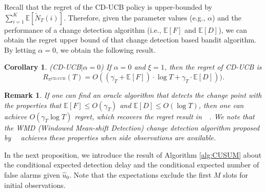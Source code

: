 \documentclass[letterpaper]{article} %
\newtheorem{corollary}{Corollary}
\newtheorem{remark}{Remark}
\newcommand{\blue}{}
\begin{document}
Recall that the regret of the CD-UCB policy is upper-bounded by
$\sum_{i=1}^K\mathbb{E}[\tilde{N}_T(i)]$.
{\blue Therefore, given the parameter values (e.g., $\alpha$) and
 the performance of a change detection algorithm (i.e.,
 $\mathbb{E}[F]$ and $\mathbb{E}[D]$),
we can obtain the regret upper bound of that change detection based
bandit algorithm.}
{\blue By letting $\alpha=0$, we obtain the following result.}

\begin{corollary}\label{thm:0CD-UCB}
\emph{(CD-UCB$|\alpha=0$)} If $\alpha=0$ and $\xi=1$, then the regret of CD-UCB is
\begin{equation}
R_{\pi^{\text{CD-UCB}}}(T)=O((\gamma_T+\mathbb{E}[F])\cdot\log T+\gamma_T\cdot\mathbb{E}[D])).
\end{equation}
\end{corollary}
\begin{remark}
If one can find an oracle algorithm that detects the change point with
the properties that $\mathbb{E}[F]\leq O(\gamma_T)$ and
$\mathbb{E}[D]\leq O(\log T)$, then one can achieve $O(\gamma_T \log
T)$ regret, which recovers the regret result
in~\citeauthor{yu2009piecewise}~. We note that the WMD (Windowed Mean-shift Detection) change detection algorithm proposed by~\citeauthor{yu2009piecewise}~ achieves these properties when side observations are available.
\end{remark}
In the next proposition, we introduce the result of Algorithm
\ref{alg:CUSUM} about the conditional expected detection delay and the
conditional expected number of false alarms given $\hat{u}_0$. Note
that the expectations exclude the first $M$ slots for initial observations.
\end{document}
